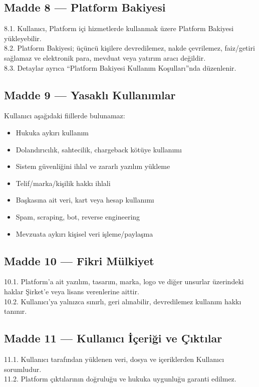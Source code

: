 \documentclass[12pt,a4paper]{article}
\begin{document}
\subsection*{Madde 8 --- Platform Bakiyesi}
8.1. Kullan{\i}c{\i}, Platform i\c{c}i hizmetlerde kullanmak \"{u}zere Platform Bakiyesi y\"{u}kleyebilir.\\
8.2. Platform Bakiyesi; \"{u}\c{c}\"{u}nc\"{u} ki\c{s}ilere devredilemez, nakde \c{c}evrilemez, faiz/getiri
sa\u{g}lamaz ve elektronik para, mevduat veya yat{\i}r{\i}m arac{\i} de\u{g}ildir.\\
8.3. Detaylar ayr{\i}ca ``Platform Bakiyesi Kullan{\i}m Ko\c{s}ullar{\i}''nda d\"{u}zenlenir.

\subsection*{Madde 9 --- Yasakl{\i} Kullan{\i}mlar}
Kullan{\i}c{\i} a\c{s}a\u{g}{\i}daki fiillerde bulunamaz:
\begin{itemize}
  \item Hukuka ayk{\i}r{\i} kullan{\i}m
  \item Doland{\i}r{\i}c{\i}l{\i}k, sahtecilik, chargeback k\"{o}t\"{u}ye kullan{\i}m{\i}
  \item Sistem g\"{u}venli\u{g}ini ihlal ve zararl{\i} yaz{\i}l{\i}m y\"{u}kleme
  \item Telif/marka/ki\c{s}ilik hakk{\i} ihlali
  \item Ba\c{s}kas{\i}na ait veri, kart veya hesap kullan{\i}m{\i}
  \item Spam, scraping, bot, reverse engineering
  \item Mevzuata ayk{\i}r{\i} ki\c{s}isel veri i\c{s}leme/payla\c{s}ma
\end{itemize}

\subsection*{Madde 10 --- Fikri M\"{u}lkiyet}
10.1. Platform'a ait yaz{\i}l{\i}m, tasar{\i}m, marka, logo ve di\u{g}er unsurlar \"{u}zerindeki haklar
\c{S}irket'e veya lisans verenlerine aittir.\\
10.2. Kullan{\i}c{\i}'ya yaln{\i}zca s{\i}n{\i}rl{\i}, geri al{\i}nabilir, devredilemez kullan{\i}m hakk{\i} tan{\i}n{\i}r.

\subsection*{Madde 11 --- Kullan{\i}c{\i} \.{I}\c{c}eri\u{g}i ve \c{C}{\i}kt{\i}lar}
11.1. Kullan{\i}c{\i} taraf{\i}ndan y\"{u}klenen veri, dosya ve i\c{c}eriklerden Kullan{\i}c{\i} sorumludur.\\
11.2. Platform \c{c}{\i}kt{\i}lar{\i}n{\i}n do\u{g}rulu\u{g}u ve hukuka uygunlu\u{g}u garanti edilmez.
\end{document}
